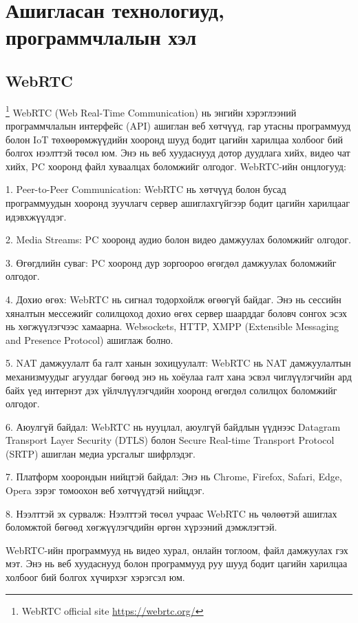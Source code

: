\section{Ашигласан технологиуд, программчлалын хэл}
\subsection{WebRTC}
\footnote{WebRTC official site \url{https://webrtc.org/}}
	\quad \quad WebRTC (Web Real-Time Communication) нь энгийн хэрэглээний программчлалын интерфейс (API) ашиглан веб хөтчүүд, гар утасны программууд болон IoT төхөөрөмжүүдийн хооронд шууд бодит цагийн харилцаа холбоог бий болгох нээлттэй төсөл юм. Энэ нь веб хуудаснууд дотор дуудлага хийх, видео чат хийх, PC хооронд файл хуваалцах боломжийг олгодог. WebRTC-ийн онцлогууд:

	1. Peer-to-Peer Communication: WebRTC нь хөтчүүд болон бусад программуудын хооронд зуучлагч сервер ашиглахгүйгээр бодит цагийн харилцааг идэвхжүүлдэг.
	
	2. Media Streams: PC хооронд аудио болон видео дамжуулах боломжийг олгодог.
	
	3. Өгөгдлийн суваг: PC хооронд дур зоргоороо өгөгдөл дамжуулах боломжийг олгодог.
	
	4. Дохио өгөх: WebRTC нь сигнал тодорхойлж өгөөгүй байдаг. Энэ нь сессийн хяналтын мессежийг солилцоход дохио өгөх сервер шаарддаг боловч сонгох  эсэх нь хөгжүүлэгчээс хамаарна. Websockets, HTTP, XMPP (Extensible Messaging and Presence Protocol) ашиглаж болно.
	
	5. NAT дамжуулалт ба галт ханын зохицуулалт: WebRTC нь NAT дамжуулалтын механизмуудыг агуулдаг бөгөөд энэ нь хоёулаа галт хана эсвэл чиглүүлэгчийн ард байх үед интернэт  дэх үйлчлүүлэгчдийн хооронд өгөгдөл солилцох боломжийг олгодог.
	
	6. Аюулгүй байдал: WebRTC нь нууцлал, аюулгүй байдлын үүднээс Datagram Transport Layer Security (DTLS) болон Secure Real-time Transport Protocol (SRTP) ашиглан медиа урсгалыг шифрлэдэг.
	
	7. Платформ хоорондын нийцтэй байдал: Энэ нь Chrome, Firefox, Safari, Edge, Opera зэрэг томоохон веб хөтчүүдтэй нийцдэг.
	
	8. Нээлттэй эх сурвалж: Нээлттэй төсөл учраас WebRTC нь чөлөөтэй ашиглах боломжтой бөгөөд хөгжүүлэгчдийн өргөн хүрээний дэмжлэгтэй.
	
	WebRTC-ийн программууд нь видео хурал, онлайн тоглоом, файл дамжуулах гэх мэт. Энэ нь веб хуудаснууд болон программууд руу шууд бодит цагийн харилцаа холбоог бий болгох хүчирхэг хэрэгсэл юм.
	\pagebreak
